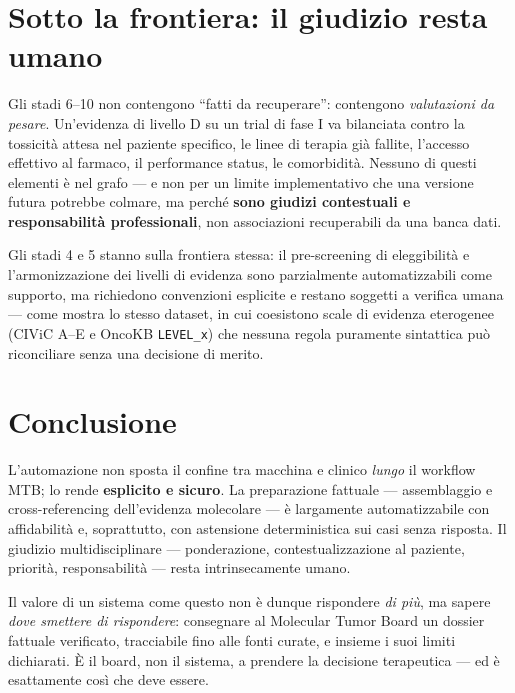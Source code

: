 \documentclass[11pt,a4paper]{report}
\begin{document}
\section{Sotto la frontiera: il giudizio resta umano}

Gli stadi 6--10 non contengono ``fatti da recuperare'': contengono
\emph{valutazioni da pesare}. Un'evidenza di livello D su un trial di fase I
va bilanciata contro la tossicità attesa nel paziente specifico, le linee di
terapia già fallite, l'accesso effettivo al farmaco, il performance status,
le comorbidità. Nessuno di questi elementi è nel grafo --- e non per un
limite implementativo che una versione futura potrebbe colmare, ma perché
\textbf{sono giudizi contestuali e responsabilità professionali}, non
associazioni recuperabili da una banca dati.

Gli stadi 4 e 5 stanno sulla frontiera stessa: il pre-screening di
eleggibilità e l'armonizzazione dei livelli di evidenza sono
parzialmente automatizzabili come supporto, ma richiedono convenzioni
esplicite e restano soggetti a verifica umana --- come mostra lo stesso
dataset, in cui coesistono scale di evidenza eterogenee (CIViC A--E e
OncoKB \texttt{LEVEL\_x}) che nessuna regola puramente sintattica può
riconciliare senza una decisione di merito.

\section{Conclusione}

L'automazione non sposta il confine tra macchina e clinico \emph{lungo} il
workflow MTB; lo rende \textbf{esplicito e sicuro}. La preparazione fattuale
--- assemblaggio e cross-referencing dell'evidenza molecolare --- è
largamente automatizzabile con affidabilità e, soprattutto, con astensione
deterministica sui casi senza risposta. Il giudizio multidisciplinare ---
ponderazione, contestualizzazione al paziente, priorità, responsabilità ---
resta intrinsecamente umano.

Il valore di un sistema come questo non è dunque rispondere \emph{di più},
ma sapere \emph{dove smettere di rispondere}: consegnare al Molecular Tumor
Board un dossier fattuale verificato, tracciabile fino alle fonti curate, e
insieme i suoi limiti dichiarati. È il board, non il sistema, a prendere la
decisione terapeutica --- ed è esattamente così che deve essere.

\end{document}
